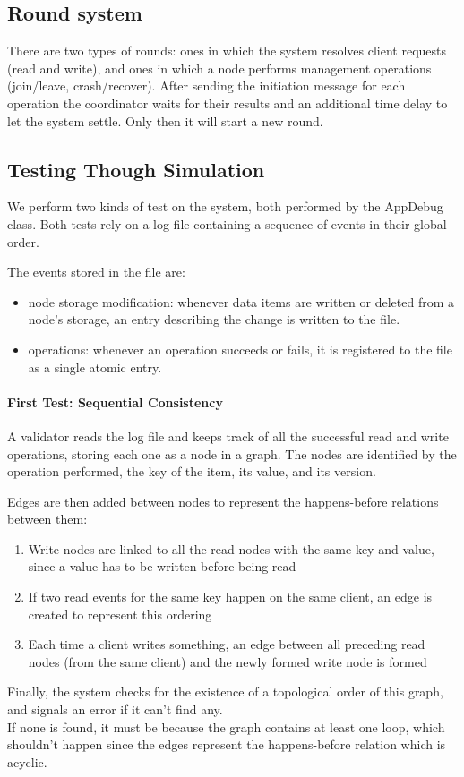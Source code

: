 \documentclass{article}
\begin{document}
\subsection{Round system}
There are two types of rounds: ones in which the system resolves client 
requests (read and write), and ones in which a node performs management 
operations (join/leave, crash/recover).
After sending the initiation message for each operation the coordinator waits 
for their results and an additional time delay to let the system settle. 
Only then it will start a new round.

\subsection{Testing Though Simulation}
We perform two kinds of test on the system, both performed by the AppDebug class. 
Both tests rely on a log file containing a sequence of events in their global order.

The events stored in the file are:
\begin{itemize}
    \item node storage modification: whenever data items are written or deleted 
    from a node's storage, an entry describing the change is written to the file.
    \item operations: whenever an operation succeeds or fails, it is registered 
    to the file as a single atomic entry.
\end{itemize}

\paragraph {First Test: Sequential Consistency}
A validator reads the log file and keeps track of all the successful read and write
operations, storing each one as a node in a graph. The nodes are identified
by the operation performed, the key of the item, its value, and its version.

Edges are then added between nodes to represent the happens-before relations between them:
\begin{enumerate}
    \item Write nodes are linked to all the read nodes with the same key and value, since
        a value has to be written before being read
    \item If two read events for the same key happen on the same client, an edge is created
        to represent this ordering
    \item Each time a client writes something, an edge between all preceding read nodes (from the same client) and the
        newly formed write node is formed
\end{enumerate}
Finally, the system checks for the existence of a topological order of this graph, and signals an error if it can't find any.\\
If none is found, it must be because the graph contains at least one loop, which shouldn't happen since the edges
represent the happens-before relation which is acyclic.
\end{document}

